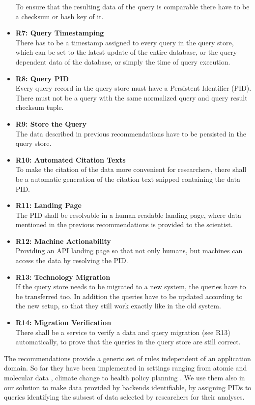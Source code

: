 \documentclass[draft,final]{vutinfth} %
\begin{document}
\begin{itemize}
	To ensure that the resulting data of the query is comparable there have to be a checksum or hash key of it. 
	\item \textbf{R7: Query Timestamping} \\
	There has to be a timestamp assigned to every query in the query store, which can be set to the latest update of the entire database, or the query dependent data of the database, or simply the time of query execution.
	\item \textbf{R8: Query PID}\\
	Every query record in the query store must have a Persistent Identifier (PID). There must not be a query with the same normalized query and query result checksum tuple. 
	\item \textbf{R9: Store the Query} \\
	The data described in previous recommendations have to be persisted in the query store.
	\item \textbf{R10: Automated Citation Texts} \\
	To make the citation of the data more convenient for researchers, there shall be a automatic generation of the citation text snipped containing the data PID.
	\item \textbf{R11: Landing Page} \\
	The PID shall be resolvable in a human readable landing page, where data mentioned in the previous recommendations is provided to the scientist.
	\item \textbf{R12: Machine Actionability} \\
	Providing an API landing page so that not only humans, but machines can access the data by resolving the PID.
	\item \textbf{R13: Technology Migration} \\
	If the query store needs to be migrated to a new system, the queries have to be transferred too. In addition the queries have to be updated according to the new setup, so that they still work exactly like in the old system.
	\item \textbf{R14: Migration Verification} \\
	There shall be a service to verify a data and query migration (see R13) automatically, to prove that the queries in the query store are still correct. 
\end{itemize}

The recommendations provide a generic set of rules independent of an application domain. So far they have been implemented in settings ranging from atomic and molecular data \cite{data_atomic}, climate change \cite{Schubert} to health policy planning \cite{data_health}. We use them also in our solution to make data provided by backends identifiable, by assigning PIDs to queries identifying the subsest of data selected by researchers for their analyses.
\end{document}
